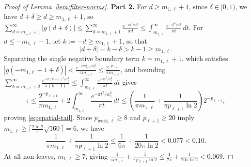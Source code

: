\begin{proof}[Proof of Lemma~\ref{lem:filter-norms}]
\textbf{Part 2.} For $d \ge m_{1,\ell} + 1$, since $\delta \in [0, 1)$, we have $d + \delta \ge d \ge m_{1,\ell} + 1$, so $\sum_{d=m_{1,\ell}+1}^\infty |g(d+\delta)| \le \sum_{d=m_{1,\ell}+1}^\infty \frac{e^{-\pi d^2/\alpha_\ell^2}}{\pi d} \le \int_{m_{1,\ell}}^\infty \frac{e^{-\pi t^2/\alpha_\ell^2}}{\pi t}\,dt$. For $d \le -m_{1,\ell} - 1$, let $k := -d \ge m_{1,\ell} + 1$, so that
\[
  |d + \delta| = k - \delta > k - 1 \ge m_{1,\ell}.
\]
Separating the single negative boundary term $k = m_{1,\ell} + 1$, which satisfies $|g(-m_{1,\ell} - 1 + \delta)| < \frac{e^{-\pi m_{1,\ell}^2/\alpha_\ell^2}}{\pi m_{1,\ell}} \le \frac{2^{-p_{\ell+1}}}{\pi m_{1,\ell}}$, and bounding $\sum_{k=m_{1,\ell}+2}^\infty \frac{e^{-\pi(k-1)^2/\alpha_\ell^2}}{\pi(k-1)} \le \int_{m_{1,\ell}}^\infty \frac{e^{-\pi t^2/\alpha_\ell^2}}{\pi t}\,dt$ gives
\[
  \tau \le \frac{2^{-p_{\ell+1}}}{\pi m_{1,\ell}} + 2 \int_{m_{1,\ell}}^\infty \frac{e^{-\pi t^2 / \alpha_\ell^2}}{\pi t}\,dt \le \left(\frac{1}{\pi m_{1,\ell}} + \frac{1}{\pi p_{\ell+1} \ln 2}\right) 2^{-p_{\ell+1}},
\]
proving \eqref{eq:spatial-tail}. Since $p_{\mathrm{work},\ell} \ge 8$ and $p_{\ell+1} \ge 20$ imply $m_{1,\ell} \ge \lceil \frac{2\ln 2}{\pi}\sqrt{160}\rceil = 6$, we have
\[
  \frac{1}{\pi m_{1,\ell}} + \frac{1}{\pi p_{\ell+1} \ln 2} \le \frac{1}{6\pi} + \frac{1}{20\pi\ln 2} < 0.077 < 0.10.
\]
At all non-leaves, $m_{1,\ell} \ge 7$, giving $\frac{1}{\pi m_{1,\ell}} + \frac{1}{\pi p_{\ell+1} \ln 2} \le \frac{1}{7\pi} + \frac{1}{20\pi\ln 2} < 0.069$.


\end{proof}
